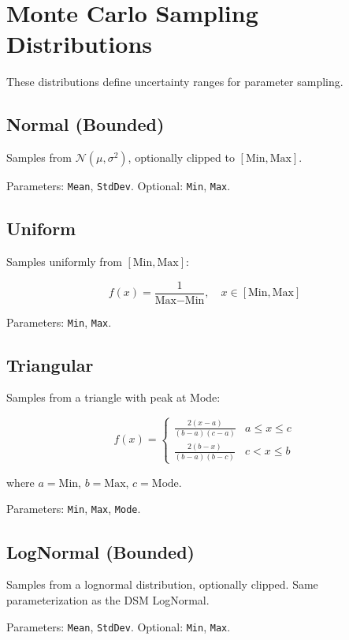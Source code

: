 \section{Monte Carlo Sampling Distributions}

These distributions define uncertainty ranges for parameter sampling.

\subsection{Normal (Bounded)}

Samples from $\mathcal{N}(\mu, \sigma^2)$, optionally clipped to $[\text{Min}, \text{Max}]$.

Parameters: \texttt{Mean}, \texttt{StdDev}. Optional: \texttt{Min}, \texttt{Max}.

\subsection{Uniform}

Samples uniformly from $[\text{Min}, \text{Max}]$:

\begin{equation}
  f(x) = \frac{1}{\text{Max} - \text{Min}}, \quad x \in [\text{Min}, \text{Max}]
\end{equation}

Parameters: \texttt{Min}, \texttt{Max}.

\subsection{Triangular}

Samples from a triangle with peak at Mode:

\begin{equation}
  f(x) = \begin{cases}
    \frac{2(x - a)}{(b - a)(c - a)} & a \leq x \leq c \\[4pt]
    \frac{2(b - x)}{(b - a)(b - c)} & c < x \leq b
  \end{cases}
\end{equation}

where $a = \text{Min}$, $b = \text{Max}$, $c = \text{Mode}$.

Parameters: \texttt{Min}, \texttt{Max}, \texttt{Mode}.

\subsection{LogNormal (Bounded)}

Samples from a lognormal distribution, optionally clipped. Same parameterization as the DSM LogNormal.

Parameters: \texttt{Mean}, \texttt{StdDev}. Optional: \texttt{Min}, \texttt{Max}.
